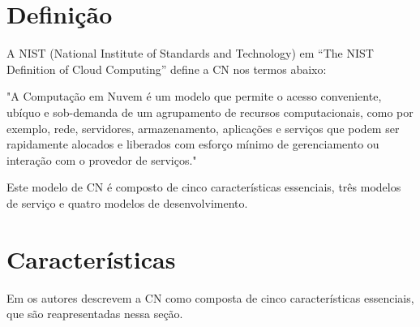 \documentclass[tcc,capa]{texufpel}
\begin{document}
\section{Definição}

A NIST (National Institute of Standards and Technology) em “The NIST Definition of Cloud Computing” \cite{mell2011nist} define a CN nos termos abaixo:

"A Computação em Nuvem é um modelo que permite o acesso conveniente, ubíquo e sob-demanda de um agrupamento de recursos computacionais, como por exemplo, rede, servidores, armazenamento, aplicações e serviços que podem ser rapidamente alocados e liberados com esforço mínimo de gerenciamento ou interação com o provedor de serviços."

Este modelo de CN é composto de cinco características essenciais, três modelos de serviço e quatro modelos de desenvolvimento.

\section{Características} \label{sec:caracteristicas}

 Em \cite{mell2011nist} os autores descrevem a CN como composta de cinco características essenciais, que são reapresentadas nessa seção.
\end{document}
